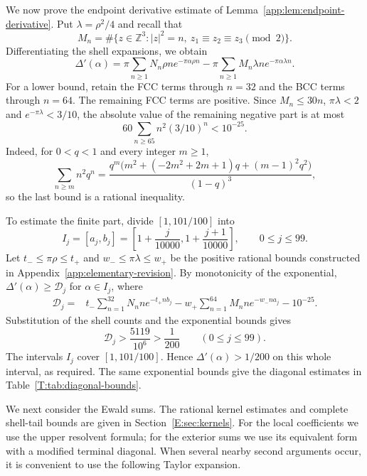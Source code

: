 \documentclass[reqno,english]{amsart}
\theoremstyle{definition}
\newtheorem{open problem}[theorem]{Open Problem}
\theoremstyle{remark}
\theoremstyle{plain}
\numberwithin{equation}{section}
\newcommand{\Z}{\mathbb Z}
\begin{document}
We now prove the endpoint derivative estimate of
Lemma~\ref{app:lem:endpoint-derivative}. Put $\lambda=\rho^2/4$ and
recall that
\[
 M_n=\#\{z\in\Z^3:|z|^2=n,\ z_1\equiv z_2\equiv z_3\pmod2\}.
\]
Differentiating the shell expansions, we obtain
\begin{equation}\label{T:eq:gapseries}
 \Delta'(\alpha)=\pi\sum_{n\ge1}N_n\rho n e^{-\pi\alpha\rho n}
       -\pi\sum_{n\ge1}M_n\lambda n e^{-\pi\alpha\lambda n}.
\end{equation}
For a lower bound, retain the FCC terms through $n=32$ and the BCC
terms through $n=64$. The remaining FCC terms are positive. Since
$M_n\le30n$, $\pi\lambda<2$ and $e^{-\pi\lambda}<3/10$, the
absolute value of the remaining negative part is at most
\begin{equation}\label{T:eq:Bderivtail}
 60\sum_{n\ge65}n^2(3/10)^n<10^{-25}.
\end{equation}
Indeed, for $0<q<1$ and every integer $m\ge1$,
\[
 \sum_{n\ge m}n^2q^n
 =\frac{q^m\bigl(m^2+(-2m^2+2m+1)q+(m-1)^2q^2\bigr)}{(1-q)^3}
,
\]
so the last bound is a rational inequality.

To estimate the finite part, divide $[1,101/100]$ into
\begin{equation}\label{T:eq:gapcells}
 I_j=[a_j,b_j]=\left[1+\frac{j}{10000},1+\frac{j+1}{10000}\right],
 \qquad 0\le j\le99.
\end{equation}
Let $t_-\le\pi\rho\le t_+$ and $w_-\le\pi\lambda\le w_+$ be
the positive rational bounds constructed in
Appendix~\ref{app:elementary-revision}. By monotonicity of the
exponential, $\Delta'(\alpha)\ge\mathscr D_j$ for $\alpha\in I_j$,
where
\begin{align}\label{T:eq:gap-finite-rational}
 \mathscr D_j={}&t_-\sum_{n=1}^{32}N_n n e^{-t_+nb_j}
   -w_+\sum_{n=1}^{64}M_n n e^{-w_-na_j}-10^{-25}.
\end{align}
Substitution of the shell counts and the exponential bounds gives
\[
 \mathscr D_j>\frac{5119}{10^6}>\frac1{200}
 \qquad(0\le j\le99).
\]
The intervals $I_j$ cover $[1,101/100]$. Hence
$\Delta'(\alpha)>1/200$ on this whole interval, as required.
The same exponential bounds give the diagonal estimates in
Table~\ref{T:tab:diagonal-bounds}.

We next consider the Ewald sums. The rational kernel estimates and
complete shell-tail bounds are given in Section~\ref{E:sec:kernels}.
For the local coefficients we use the upper resolvent formula; for the
exterior sums we use its equivalent form with a modified terminal
diagonal. When several nearby second arguments occur, it is convenient
to use the following Taylor expansion.
\end{document}
